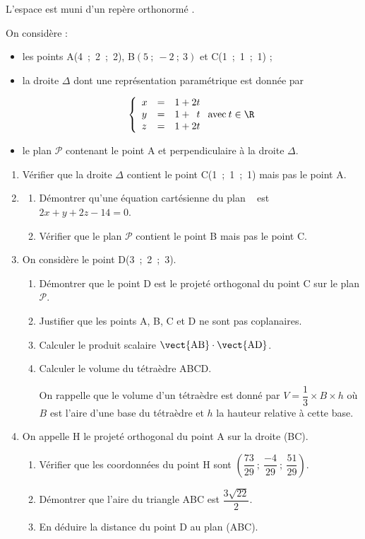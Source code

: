 L'espace est muni d'un repère orthonormé \Oijk.

On considère :

\begin{itemize}[label=$\bullet~$]
\item les points A(4~;~2~;~2), B$(5~;~-2~;~3)$ et C(1~;~1~;~1) ;
\item la droite $\Delta$ dont une représentation paramétrique est donnée par

\[\left\{\begin{array}{lc l}
x	&=& 1 + 2t\\
y 	&=&1+ \phantom{2}t\\
z 	&=& 1 +2t\\
\end{array}\right. \text{avec}\: t \in \R\]

\item le plan $\mathcal{P}$ contenant le point A et perpendiculaire à la droite $\Delta$.
\end{itemize}

\medskip

\begin{enumerate}
\item Vérifier que la droite $\Delta$ contient le point C(1~;~1~;~1) mais pas le point A.
\item
	\begin{enumerate}
		\item Démontrer qu'une équation cartésienne du plan ~ est $2x + y + 2z - 14 = 0$.
		\item Vérifier que le plan $\mathcal{P}$ contient le point B mais pas le point C.
	\end{enumerate}
\item On considère le point D(3~;~2~;~3).
	\begin{enumerate}
		\item Démontrer que le point D est le projeté orthogonal du point C sur le plan $\mathcal{P}$.
		\item Justifier que les points A, B, C et D ne sont pas coplanaires.
		\item Calculer le produit scalaire $\vect{\text{AB}} \cdot \vect{\text{AD}}$.
		\item Calculer le volume du tétraèdre ABCD.
		
On rappelle que le volume d'un tétraèdre est donné par $V = \dfrac13 \times B \times h$ où $B$ est l'aire d'une base du tétraèdre et $h$ la hauteur relative à cette base.

	\end{enumerate}
\item On appelle H le projeté orthogonal du point A sur la droite (BC).
	\begin{enumerate}
		\item Vérifier que les coordonnées du point H sont $\left(\dfrac{73}{29}~;~\dfrac{-4}{29}~;~\dfrac{51}{29}\right)$.
		\item Démontrer que l'aire du triangle ABC est $\dfrac{3\sqrt{22}}{2}$.
		\item En déduire la distance du point D au plan (ABC).
	\end{enumerate}
\end{enumerate}

\medskip
